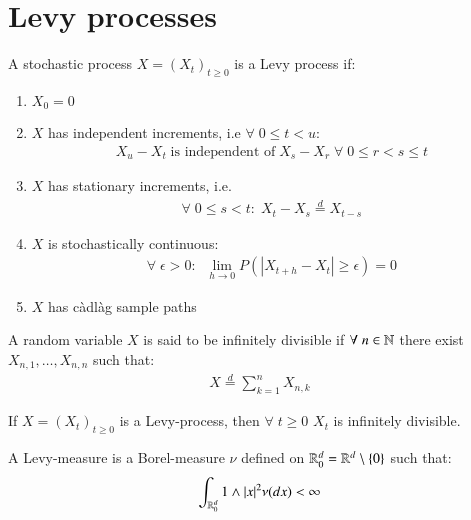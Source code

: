 \newpage

\newpage
\section{Levy processes}

\begin{definition}
A stochastic process $X = (X_{t})_{t\geq 0}$ is a Levy process if:
\begin{enumerate}[leftmargin =*]
    \item $X_{0} = 0$
    \item $X$ has independent increments, i.e $\forall \; 0\leq t < u:$
    \begin{align*}
    X_{u}-X_{t}\;\text{is independent of}\;X_{s}-X_{r}\; \forall\; 0 \leq r < s \leq t    
    \end{align*}
    \item $X$ has stationary increments, i.e. 
    \begin{align*}
    \forall\; 0 \leq s < t: \; X_{t}-X_{s} \stackrel{d}{=} X_{t-s}
    \end{align*}
    \item $X$ is stochastically continuous: 
    \begin{align*}
    \forall \; \epsilon > 0: \;\; \lim\limits_{h \to 0}P(|X_{t+h}-X_{t}| \geq \epsilon) = 0 
    \end{align*}
    \item $X$ has càdlàg  sample paths
\end{enumerate}
\end{definition}

\begin{definition}
A random variable $X$ is said to be infinitely divisible if $\forall\; n\in \mathbb{N}$ there exist $X_{n,1}, \dots, X_{n,n}$ such that: 
\begin{align*}
X \stackrel{d}{=} \sum_{k=1}^{n}X_{n,k}
\end{align*}
\end{definition}

\begin{proposition}
If $X = (X_{t})_{t\geq 0}$ is a Levy-process, then $\forall\; t\geq 0$ $X_{t}$ is infinitely divisible. 
\end{proposition}

\begin{definition}
A Levy-measure is a Borel-measure  $\nu$  defined on $\mathbb{R}_{0}^{d} = \mathbb{R}^{d}\setminus \{0\}$ 
such that: 
\begin{align*}
\int_{\mathbb{R}_{0}^{d}}1\wedge|x|^{2}\nu(dx) < \infty    
\end{align*}
\end{definition}

